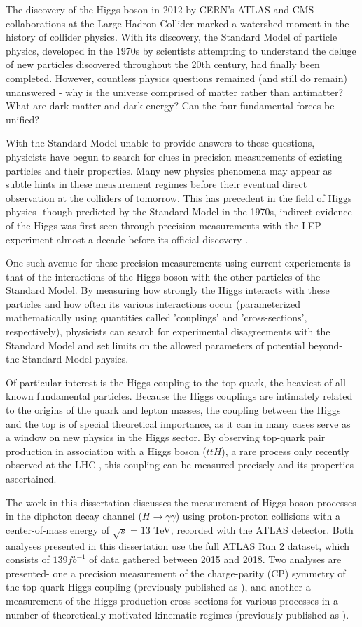 The discovery of the Higgs boson in 2012 by CERN's ATLAS \cite{HiggsATLAS} and CMS \cite{HiggsCMS} collaborations at the Large Hadron Collider marked a watershed moment in the history of collider physics. With its discovery, the Standard Model of particle physics, developed in the 1970s by scientists attempting to understand the deluge of new particles discovered throughout the 20th century, had finally been completed. However, countless physics questions remained (and still do remain) unanswered - why is the universe comprised of matter rather than antimatter? What are dark matter and dark energy? Can the four fundamental forces be unified?

With the Standard Model unable to provide answers to these questions, physicists have begun to search for clues in precision measurements of existing particles and their properties. Many new physics phenomena may appear as subtle hints in these measurement regimes before their eventual direct observation at the colliders of tomorrow. This has precedent in the field of Higgs physics- though predicted by the Standard Model in the 1970s, indirect evidence of the Higgs was first seen through precision measurements with the LEP experiment almost a decade before its official discovery \cite{LEPExperiments}.

One such avenue for these precision measurements using current experiements is that of the interactions of the Higgs boson with the other particles of the Standard Model. By measuring how strongly the Higgs interacts with these particles and how often its various interactions occur (parameterized mathematically using quantities called 'couplings' and 'cross-sections', respectively), physicists can search for experimental disagreements with the Standard Model and set limits on the allowed parameters of potential beyond-the-Standard-Model physics.

Of particular interest is the Higgs coupling to the top quark, the heaviest of all known fundamental particles. Because the Higgs couplings are intimately related to the origins of the quark and lepton masses, the coupling between the Higgs and the top is of special theoretical importance, as it can in many cases serve as a window on new physics in the Higgs sector. By observing top-quark pair production in association with a Higgs boson ($ttH$), a rare process only recently observed at the LHC \cite{ttH}, this coupling can be measured precisely and its properties ascertained.

The work in this dissertation discusses the measurement of Higgs boson processes in the diphoton decay channel ($H \rightarrow \gamma \gamma$) using proton-proton collisions with a center-of-mass energy of $\sqrt{s} = 13$ TeV, recorded with the ATLAS detector.  Both analyses presented in this dissertation use the full ATLAS Run 2 dataset, which consists of $139 fb^{-1}$ of data gathered between 2015 and 2018. Two analyses are presented- one a precision measurement of the charge-parity (CP) symmetry of the top-quark-Higgs coupling (previously published as \cite{CPanalysis}), and another a measurement of the Higgs production cross-sections for various processes in a number of theoretically-motivated kinematic regimes (previously published as \cite{Couplingsanalysis}).
 
